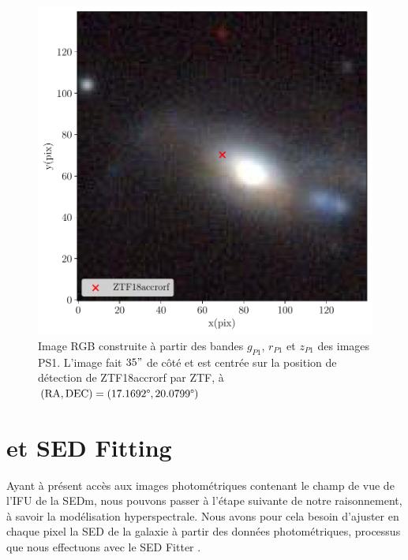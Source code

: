 \documentclass[../main/main.tex]{subfiles}
\begin{document}
\begin{figure}[ht]
  \begin{minipage}[c]{0.45\textwidth}
    \includegraphics[width=\textwidth]{../figures/05_sedfit/ps_cutouts_ZTF18accrorf.pdf}
  \end{minipage}\hfill
  \begin{minipage}[c]{0.52\textwidth}
    \caption[Image RGB de PS1 centrée sur ZTF18accrorf.]{Image RGB
      construite à partir des bandes $g_{P1}$, $r_{P1}$ et
      $z_{P1}$ des images PS1. L'image fait $35"$ de côté et est centrée sur la position de
      détection de ZTF18accrorf par ZTF, à $(\text{RA}, \text{DEC})=(17.1692\degree,20.0799\degree)$}\label{fig:pscutoutsZTF18accrorf}
  \end{minipage}
\end{figure}


\section{ et SED Fitting}
\label{sec:cigale}

Ayant à présent accès aux images photométriques contenant le champ
de vue de l'IFU de la SEDm, nous pouvons passer à l'étape suivante de
notre raisonnement, à savoir la modélisation hyperspectrale. Nous
avons pour cela besoin d'ajuster en chaque pixel la SED de la
galaxie à partir des données photométriques, processus que nous
effectuons avec le SED Fitter .
\end{document}
